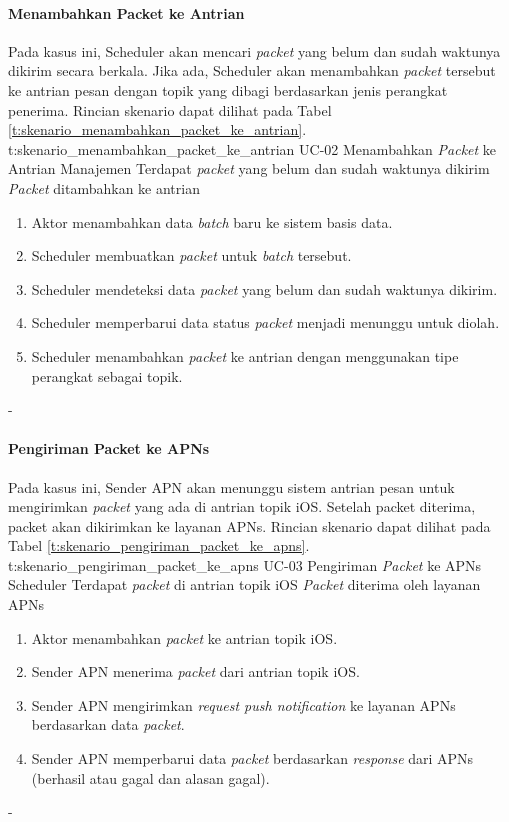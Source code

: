 \paragraph{Menambahkan Packet ke Antrian}
\par Pada kasus ini, Scheduler akan mencari \textit{packet} yang belum dan sudah waktunya dikirim secara berkala. Jika ada, Scheduler akan menambahkan \textit{packet} tersebut ke antrian pesan dengan topik yang dibagi berdasarkan jenis perangkat penerima. Rincian skenario dapat dilihat pada Tabel \ref{t:skenario_menambahkan_packet_ke_antrian}.
\tableUcDesc
{t:skenario_menambahkan_packet_ke_antrian}
{UC-02}
{Menambahkan \textit{Packet} ke Antrian}
{Manajemen}
{Terdapat \textit{packet} yang belum dan sudah waktunya dikirim}
{\textit{Packet} ditambahkan ke antrian}
{
\begin{enumerate}
    \item Aktor menambahkan data \textit{batch} baru ke sistem basis data.
    \item Scheduler membuatkan \textit{packet} untuk \textit{batch} tersebut.
    \item Scheduler mendeteksi data \textit{packet} yang belum dan sudah waktunya dikirim.
    \item Scheduler memperbarui data status \textit{packet} menjadi menunggu untuk diolah.
    \item Scheduler menambahkan \textit{packet} ke antrian dengan menggunakan tipe perangkat sebagai topik.
\end{enumerate}
}
{-}

\paragraph{Pengiriman Packet ke APNs}
\par Pada kasus ini, Sender APN akan menunggu sistem antrian pesan untuk mengirimkan \textit{packet} yang ada di antrian topik iOS. Setelah packet diterima, packet akan dikirimkan ke layanan APNs. Rincian skenario dapat dilihat pada Tabel \ref{t:skenario_pengiriman_packet_ke_apns}.
\tableUcDesc
{t:skenario_pengiriman_packet_ke_apns}
{UC-03}
{Pengiriman \textit{Packet} ke APNs}
{Scheduler}
{Terdapat \textit{packet} di antrian topik iOS}
{\textit{Packet} diterima oleh layanan APNs}
{
\begin{enumerate}
	\item Aktor menambahkan \textit{packet} ke antrian topik iOS.
    \item Sender APN menerima \textit{packet} dari antrian topik iOS.
    \item Sender APN mengirimkan \textit{request push notification} ke layanan APNs berdasarkan data \textit{packet}.
    \item Sender APN memperbarui data \textit{packet} berdasarkan \textit{response} dari APNs (berhasil atau gagal dan alasan gagal).
\end{enumerate}
}
{-}

